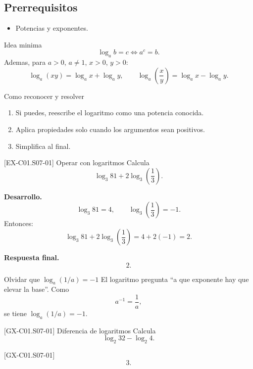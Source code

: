 \subsection*{Prerrequisitos}
\begin{itemize}
  \item Potencias y exponentes.
\end{itemize}

\begin{theorybox}{Idea minima}
\[
\log_a b=c \Longleftrightarrow a^c=b.
\]
Ademas, para \(a>0\), \(a\neq 1\), \(x>0\), \(y>0\):
\[
\log_a(xy)=\log_a x+\log_a y,
\qquad
\log_a\left(\frac{x}{y}\right)=\log_a x-\log_a y.
\]
\end{theorybox}

\begin{methodbox}{Como reconocer y resolver}
\begin{enumerate}
  \item Si puedes, reescribe el logaritmo como una potencia conocida.
  \item Aplica propiedades solo cuando los argumentos sean positivos.
  \item Simplifica al final.
\end{enumerate}
\end{methodbox}

\begin{solvedexample}{[EX-C01.S07-01] Operar con logaritmos}
Calcula
\[
\log_3 81 + 2\log_3\left(\frac{1}{3}\right).
\]

\textbf{Desarrollo.}
\[
\log_3 81=4,
\qquad
\log_3\left(\frac{1}{3}\right)=-1.
\]
Entonces:
\[
\log_3 81 + 2\log_3\left(\frac{1}{3}\right)=4+2(-1)=2.
\]

\textbf{Respuesta final.}
\[
\boxed{2}.
\]
\end{solvedexample}

\begin{commonerror}{Olvidar que \(\log_a(1/a)=-1\)}
El logaritmo pregunta ``a que exponente hay que elevar la base''. Como
\[
a^{-1}=\frac{1}{a},
\]
se tiene \(\log_a(1/a)=-1\).
\end{commonerror}

\begin{guidedexercise}{[GX-C01.S07-01] Diferencia de logaritmos}
Calcula
\[
\log_2 32-\log_2 4.
\]
\end{guidedexercise}

\begin{shortanswer}{[GX-C01.S07-01]}
\[
3.
\]
\end{shortanswer}


